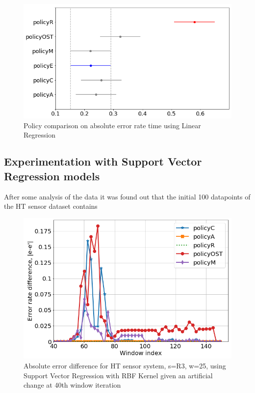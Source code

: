 \documentclass{mpaper}
\begin{document}
\begin{figure}[h]
    \centering
    \includegraphics[scale=0.35]{imgs/lin_reg_pi3_error_plot_diff_means.png}
    \caption{Policy comparison on absolute error rate time using Linear Regression}
    \label{fig:svr_rbf_R5_waiting_plot_diff_means}
\end{figure}

\subsection{Experimentation with Support Vector Regression models}

After some analysis of the data it was found out that the initial 100 datapoints of the HT sensor dataset contains 

\begin{figure}[h]
    \centering
    \includegraphics[scale=0.33]{imgs/svr_rbf_R3_w25.png}
    \caption{Absolute error difference for HT sensor system, s=R3, w=25,
    using Support Vector Regression with RBF Kernel 
    given an artificial change at 40th window iteration}
    \label{fig:err_rbf_svr_R3}
\end{figure}
\end{document}
